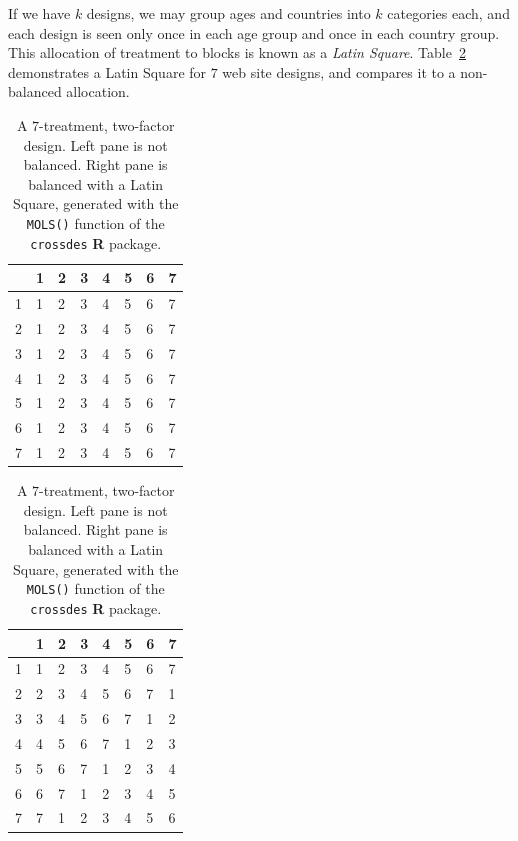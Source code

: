 \documentclass[12pt,a4paper]{report}
\theoremstyle{plain}
\theoremstyle{definition}
\newcommand{\R}{\textnormal{\sffamily\bfseries R }}
\newcommand{\rcode}[1]{\texttt{#1}}
\begin{document}
If we have $k$ designs, we may group ages and countries into $k$ categories each, and each design is seen only once in each age group and once in each country group. 
This allocation of treatment to blocks is known as a \emph{Latin Square}. 
Table~\ref{tab:latin_square} demonstrates a Latin Square for $7$ web site designs, and compares it to a non-balanced allocation. 
\begin{table}[ht]
    \begin{minipage}{.5\linewidth}
        \centering
		\begin{tabular}{rlllllll}
		  \hline
		 & 1 & 2 & 3 & 4 & 5 & 6 & 7 \\ 
		  \hline
		1 & 1 & 2 & 3 & 4 & 5 & 6 & 7 \\ 
		2 & 1 & 2 & 3 & 4 & 5 & 6 & 7 \\ 
		3 & 1 & 2 & 3 & 4 & 5 & 6 & 7 \\ 
		4 & 1 & 2 & 3 & 4 & 5 & 6 & 7 \\ 
		5 & 1 & 2 & 3 & 4 & 5 & 6 & 7 \\ 
		6 & 1 & 2 & 3 & 4 & 5 & 6 & 7 \\ 
		7 & 1 & 2 & 3 & 4 & 5 & 6 & 7 \\ 
		   \hline
		\end{tabular}
    \end{minipage}    \begin{minipage}{.5\linewidth}
      \centering
		\begin{tabular}{rlllllll}
		  \hline
		 & 1 & 2 & 3 & 4 & 5 & 6 & 7 \\ 
		  \hline
		1 & 1 & 2 & 3 & 4 & 5 & 6 & 7 \\ 
		  2 & 2 & 3 & 4 & 5 & 6 & 7 & 1 \\ 
		  3 & 3 & 4 & 5 & 6 & 7 & 1 & 2 \\ 
		  4 & 4 & 5 & 6 & 7 & 1 & 2 & 3 \\ 
		  5 & 5 & 6 & 7 & 1 & 2 & 3 & 4 \\ 
		  6 & 6 & 7 & 1 & 2 & 3 & 4 & 5 \\ 
		  7 & 7 & 1 & 2 & 3 & 4 & 5 & 6 \\ 
		   \hline
		\end{tabular}
		\end{minipage} 
	\caption{A $7$-treatment, two-factor design. 
	Left pane is not balanced.
	Right pane is balanced with a Latin Square, generated with the \rcode{MOLS()} function of the \rcode{crossdes} \R package.}
	\label{tab:latin_square}		
\end{table}
\end{document}
